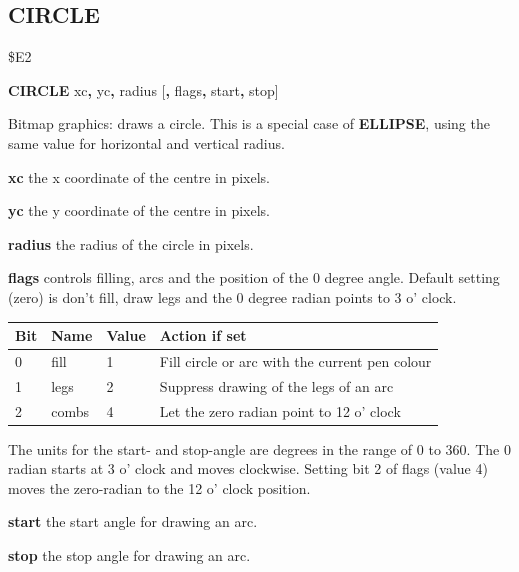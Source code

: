 \subsection{CIRCLE}
\begin{description}[leftmargin=2cm,style=nextline]
\item [Token:]   \$E2

\item [Format:]  {\bf CIRCLE} xc{\bf,} yc{\bf,} radius [{\bf,} flags{\bf,} start{\bf,} stop]

\item [Usage:]   Bitmap graphics: draws a circle. This is a special case of {\bf ELLIPSE}, using the same value for horizontal and vertical radius.

                 {\bf xc} the x coordinate of the centre in pixels.

                 {\bf yc} the y coordinate of the centre in pixels.

                 {\bf radius} the radius of the circle in pixels.

                 {\bf flags} controls filling, arcs and the position of the 0 degree angle. Default setting (zero) is don't fill, draw legs and the 0 degree radian points to 3 o' clock.

                 {\setlength{\tabcolsep}{1.5mm}
                 \begin{tabular}{|l|l|l|l|}
                 \hline
                 {\bf Bit}  & {\bf Name} & {\bf Value} & {\bf Action if set} \\
                 \hline
                 0 & fill  & 1  & Fill circle or arc with the current pen colour \\
                 1 & legs  & 2  & Suppress drawing of the legs of an arc \\
                 2 & combs & 4  & Let the zero radian point to 12 o' clock \\
                 \hline
                 \end{tabular}
                 }

                 The units for the start- and stop-angle are degrees in the range of 0 to 360. The 0 radian starts at 3 o' clock and moves clockwise. Setting bit 2 of flags (value 4) moves the zero-radian to the 12 o' clock position.

                 {\bf start} the start angle for drawing an arc.

                 {\bf stop} the stop angle for drawing an arc.


\end{description}
